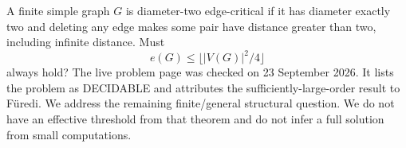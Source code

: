 A finite simple graph $G$ is diameter-two edge-critical if it has diameter exactly two and deleting any edge makes some pair have distance greater than two, including infinite distance. Must
\[
 e(G)\leq\lfloor |V(G)|^2/4\rfloor
\]
always hold? The live problem page was checked on 23 September 2026. It lists the problem as DECIDABLE and attributes the sufficiently-large-order result to F\"uredi. We address the remaining finite/general structural question. We do not have an effective threshold from that theorem and do not infer a full solution from small computations.

